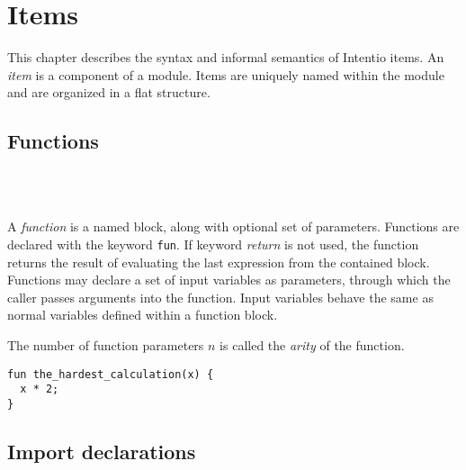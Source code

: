 \chapter{Items}

This chapter describes the syntax and informal semantics of Intentio items. An \emph{item} is a component of a module. Items are uniquely named within the module and are organized in a flat structure.

\begin{bnf}
   \eq    {}    
                \gorln {} 
\end{bnf}

\section{Functions}

\begin{bnf}
   \eq {} \  \ \term{(} \  \ \term{)} \  \\
   \eq {} \  \ \gtry{\term{,}}
\end{bnf}

A \emph{function} is a named block, along with optional set of parameters. Functions are declared with the keyword \lstinline{fun}. If keyword \emph{return} is not used, the function returns the result of evaluating the last expression from the contained block. Functions may declare a set of input variables as parameters, through which the caller passes arguments into the function. Input variables behave the same as normal variables defined within a function block.

The number of function parameters $n$ is called the \emph{arity} of the function.

\begin{example}
\begin{lstlisting}[language=intentio]
fun the_hardest_calculation(x) {
  x * 2;
}
\end{lstlisting}
\end{example}

\section{Import declarations}

